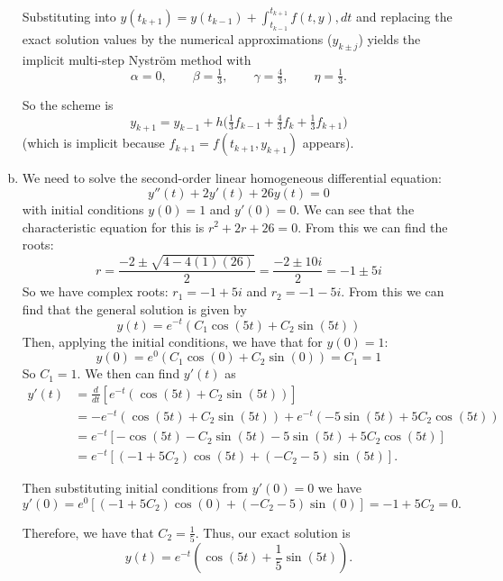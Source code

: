 \documentclass{article}
\begin{document}
\begin{enumerate}[(a)]
    Substituting into $y(t_{k+1})=y(t_{k-1})+\int_{t_{k-1}}^{t_{k+1}} f(t,y),dt$ and replacing the exact solution values by the numerical approximations ($y_{k\pm j}$) yields the implicit multi-step Nyström method with
   \[
    \alpha=0,\qquad \beta=\tfrac{1}{3},\qquad \gamma=\tfrac{4}{3},\qquad \eta=\tfrac{1}{3}.
   \]

    So the scheme is
   \[
    y_{k+1}=y_{k-1}+h\Big(\tfrac{1}{3}f_{k-1}+\tfrac{4}{3}f_k+\tfrac{1}{3}f_{k+1}\Big)
   \]
    (which is implicit because $f_{k+1}=f(t_{k+1},y_{k+1})$ appears).


    \item We need to solve the second-order linear homogeneous differential equation:
        $$y''(t) + 2y'(t) + 26y(t) = 0$$
        with initial conditions $y(0) = 1$ and $y'(0) = 0$.
        We can see that the characteristic equation for this is $r^2 + 2r + 26 = 0$. From this we can find the roots:
        $$r = \frac{-2 \pm \sqrt{4 - 4(1)(26)}}{2} = \frac{-2 \pm 10i}{2} = -1 \pm 5i$$
        So we have complex roots: $r_1 = -1 + 5i$ and $r_2 = -1 - 5i$. From this we can find that the general solution is given by
        $$y(t) = e^{-t}(C_1 \cos(5t) + C_2 \sin(5t))$$
        Then, applying the initial conditions, we have that for $y(0) = 1$:
        $$y(0) = e^{0}(C_1 \cos(0) + C_2 \sin(0)) = C_1 = 1$$
        So $C_1 = 1$.
        We then can find $y'(t)$ as 
        \begin{align*}
            y'(t) &= \frac{d}{dt}[e^{-t}(\cos(5t) + C_2 \sin(5t))] \\
            &= -e^{-t}(\cos(5t) + C_2 \sin(5t)) + e^{-t}(-5\sin(5t) + 5C_2 \cos(5t)) \\
            &= e^{-t}[-\cos(5t) - C_2 \sin(5t) - 5\sin(5t) + 5C_2 \cos(5t)] \\
            &= e^{-t}[(-1 + 5C_2)\cos(5t) + (-C_2 - 5)\sin(5t)].
        \end{align*}

        Then substituting initial conditions from $y'(0) = 0$ we have
        $$y'(0) = e^{0}[(-1 + 5C_2)\cos(0) + (-C_2 - 5)\sin(0)] = -1 + 5C_2 = 0.$$

        Therefore, we have that $C_2 = \frac{1}{5}$. Thus, our exact solution is
        $$y(t) = e^{-t}\left(\cos(5t) + \frac{1}{5}\sin(5t)\right).$$


\end{enumerate}
\end{document}
